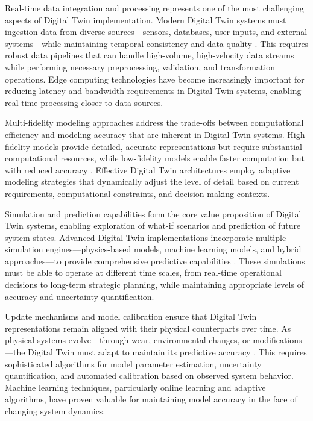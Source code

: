 Real-time data integration and processing represents one of the most challenging aspects of Digital Twin implementation. Modern Digital Twin systems must ingestion data from diverse sources—sensors, databases, user inputs, and external systems—while maintaining temporal consistency and data quality \cite{kritzinger2018digital}. This requires robust data pipelines that can handle high-volume, high-velocity data streams while performing necessary preprocessing, validation, and transformation operations. Edge computing technologies have become increasingly important for reducing latency and bandwidth requirements in Digital Twin systems, enabling real-time processing closer to data sources.

Multi-fidelity modeling approaches address the trade-offs between computational efficiency and modeling accuracy that are inherent in Digital Twin systems. High-fidelity models provide detailed, accurate representations but require substantial computational resources, while low-fidelity models enable faster computation but with reduced accuracy \cite{rasheed2020digital}. Effective Digital Twin architectures employ adaptive modeling strategies that dynamically adjust the level of detail based on current requirements, computational constraints, and decision-making contexts.

Simulation and prediction capabilities form the core value proposition of Digital Twin systems, enabling exploration of what-if scenarios and prediction of future system states. Advanced Digital Twin implementations incorporate multiple simulation engines—physics-based models, machine learning models, and hybrid approaches—to provide comprehensive predictive capabilities \cite{fuller2020digital}. These simulations must be able to operate at different time scales, from real-time operational decisions to long-term strategic planning, while maintaining appropriate levels of accuracy and uncertainty quantification.

Update mechanisms and model calibration ensure that Digital Twin representations remain aligned with their physical counterparts over time. As physical systems evolve—through wear, environmental changes, or modifications—the Digital Twin must adapt to maintain its predictive accuracy \cite{liu2021review}. This requires sophisticated algorithms for model parameter estimation, uncertainty quantification, and automated calibration based on observed system behavior. Machine learning techniques, particularly online learning and adaptive algorithms, have proven valuable for maintaining model accuracy in the face of changing system dynamics.

